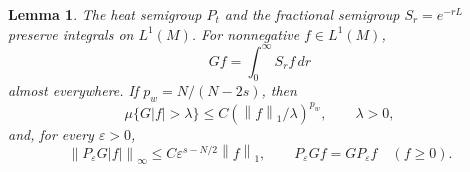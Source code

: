 \documentclass[11pt]{article}
\newtheorem{lemma}[theorem]{Lemma}
\theoremstyle{definition}
\theoremstyle{remark}
\newcommand{\norm}[1]{\left\|#1\right\|}
\begin{document}
\begin{lemma}\label{lem:linear}
The heat semigroup \(P_t\) and the fractional semigroup \(S_r=e^{-rL}\)
preserve integrals on \(L^1(M)\). For nonnegative \(f\in L^1(M)\),
\begin{equation}\label{eq:potential}
 Gf=\int_0^\infty S_rf\,dr
\end{equation}
almost everywhere. If \(p_w=N/(N-2s)\), then
\begin{equation}\label{eq:weak}
 \mu\{G|f|>\lambda\}\le
 C(\norm{f}_1/\lambda)^{p_w},\qquad \lambda>0,
\end{equation}
and, for every \(\varepsilon>0\),
\begin{equation}\label{eq:heatpotential}
 \norm{P_\varepsilon G|f|}_\infty
 \le C\varepsilon^{s-N/2}\norm{f}_1,\qquad
 P_\varepsilon Gf=GP_\varepsilon f\quad(f\ge0).
\end{equation}
\end{lemma}
\end{document}
